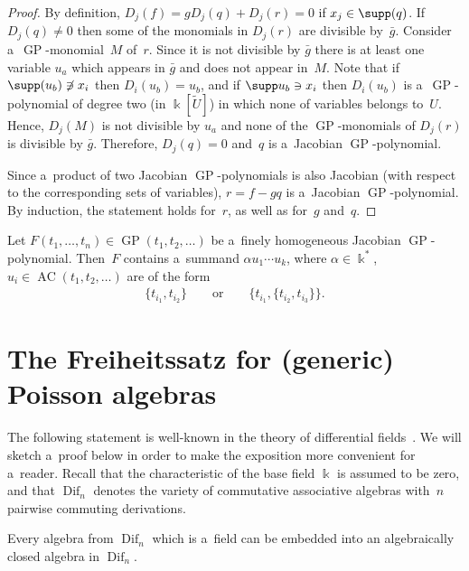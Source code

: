 \begin{proof}
By def\/inition, $D_j(f) = gD_j(q) + D_j(r) = 0$ if $x_j \in \supp(q)$.
If $D_j(q) \neq 0$ then some of the monomials in $D_j(r)$ are divisible by~$\bar g$.
Consider a~$\operatorname{GP}$-monomial~$M$ of~$r$.
Since it is not divisible by $\bar g$ there is at least one variable $u_a$ which appears in $\bar g$ and does not appear
in~$M$.
Note that if $\supp(u_b) \not\ni x_i$ then $D_i(u_b) = u_b$, and if $\supp u_b \ni x_i$ then
$D_i(u_b)$ is a~$\operatorname{GP}$-polynomial of degree two (in $\Bbbk[\widetilde U]$) in which none of variables belongs to~$U$.
Hence, $D_j(M)$ is not divisible by $u_a$ and none of the $\operatorname{GP}$-monomials of $D_j(r)$ is divisible by $\bar g$.
Therefore, $D_j(q) = 0$ and~$q$ is a~Jacobian $\operatorname{GP}$-polynomial.

Since a~product of two Jacobian $\operatorname{GP}$-polynomials is also Jacobian (with respect to the corresponding sets of variables),
$r=f-gq$ is a~Jacobian $\operatorname{GP}$-polynomial.
By induction, the statement holds for~$r$, as well as for~$g$ and~$q$.
\end{proof}

\begin{corollary}
\label{cor:2DerLeftJustified}
Let $F(t_1,\dots, t_n) \in \operatorname{GP}(t_1,t_2, \dots)$ be a~finely homogeneous Jacobian $\operatorname{GP}$-poly\-no\-mi\-al.
Then~$F$ contains a~summand $\alpha u_1\cdots u_k$, where $\alpha \in \Bbbk^*$, $u_i\in \operatorname{AC}(t_1,t_2, \dots)$ are of the
form
\begin{gather*}
\{t_{i_1},t_{i_2}\}
\qquad
\text{or}
\qquad
\{t_{i_1},\{t_{i_2},t_{i_3}\}\}.
\end{gather*}
\end{corollary}


\section{The Freiheitssatz for (generic) Poisson algebras}

The following statement is well-known in the theory of dif\/ferential f\/ields~\cite{Kolchin, Ritt}.
We will sketch a~proof below in order to make the exposition more convenient for a~reader.
Recall that the characteristic of the base f\/ield $\Bbbk $ is assumed to be zero, and that $\operatorname{Dif}_n$ denotes the variety of
commutative associative algebras with~$n$ pairwise commuting derivations.

\begin{theorem}
Every algebra from $\operatorname{Dif}_n$ which is a~field can be embedded into an algebraically closed algebra in $\operatorname{Dif}_n$.
\end{theorem}

